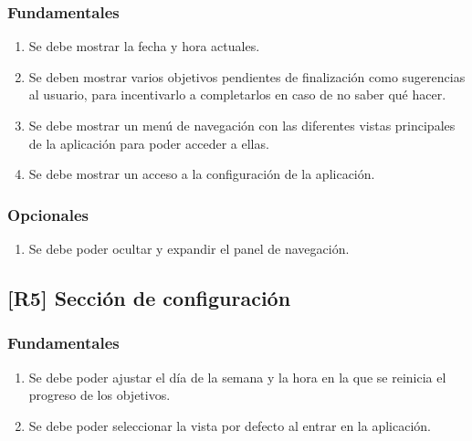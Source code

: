 \documentclass[10pt, a4paper]{aqademic}
\begin{document}
\subsubsection*{Fundamentales}

\begin{enumerate}[label=\textbf{R4.\arabic*f}, leftmargin=10mm]
	\item Se debe mostrar la fecha y hora actuales.
	
	\item Se deben mostrar varios objetivos pendientes de finalización como sugerencias al usuario, para incentivarlo a completarlos en caso de no saber qué hacer.
	
	\item Se debe mostrar un menú de navegación con las diferentes vistas principales de la aplicación para poder acceder a ellas.
	
	\item Se debe mostrar un acceso a la configuración de la aplicación.
\end{enumerate}

\subsubsection*{Opcionales}

\begin{enumerate}[label=\textbf{R4.\arabic*o}, leftmargin=10mm]
	\item Se debe poder ocultar y expandir el panel de navegación.
\end{enumerate}


\subsection*{[R5] Sección de configuración}

\subsubsection*{Fundamentales}

\begin{enumerate}[label=\textbf{R5.\arabic*f}, leftmargin=10mm]
	\item Se debe poder ajustar el día de la semana y la hora en la que se reinicia el progreso de los objetivos.
	
	\item Se debe poder seleccionar la vista por defecto al entrar en la aplicación.
\end{enumerate}
\end{document}
